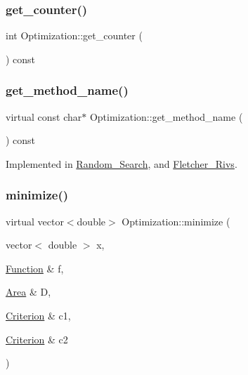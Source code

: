\subsubsection{\texorpdfstring{get\+\_\+counter()}{get\_counter()}}
{\footnotesize\ttfamily int Optimization\+::get\+\_\+counter (\begin{DoxyParamCaption}{ }\end{DoxyParamCaption}) const\hspace{0.3cm}{\ttfamily [inline]}}

\mbox{\label{class_optimization_a7d4cf7e7c0d0726822e6e29adecbd252}} 
\subsubsection{\texorpdfstring{get\+\_\+method\+\_\+name()}{get\_method\_name()}}
{\footnotesize\ttfamily virtual const char$\ast$ Optimization\+::get\+\_\+method\+\_\+name (\begin{DoxyParamCaption}{ }\end{DoxyParamCaption}) const\hspace{0.3cm}{\ttfamily [pure virtual]}}



Implemented in \hyperlink{class_random___search_a4ba44714765f2835a63765d8ac62dc35}{Random\+\_\+\+Search}, and \hyperlink{class_fletcher___rivs_a2aa5d90c6c4ac0773533adb4ec7c9038}{Fletcher\+\_\+\+Rivs}.

\mbox{\label{class_optimization_afbcc2bddcaf625671385b2e2d77fc038}} 
\subsubsection{\texorpdfstring{minimize()}{minimize()}}
{\footnotesize\ttfamily virtual vector$<$double$>$ Optimization\+::minimize (\begin{DoxyParamCaption}\item[{vector$<$ double $>$}]{x,  }\item[{\hyperlink{class_function}{Function} \&}]{f,  }\item[{\hyperlink{class_area}{Area} \&}]{D,  }\item[{\hyperlink{class_criterion}{Criterion} \&}]{c1,  }\item[{\hyperlink{class_criterion}{Criterion} \&}]{c2 }\end{DoxyParamCaption})\hspace{0.3cm}{\ttfamily [pure virtual]}}



